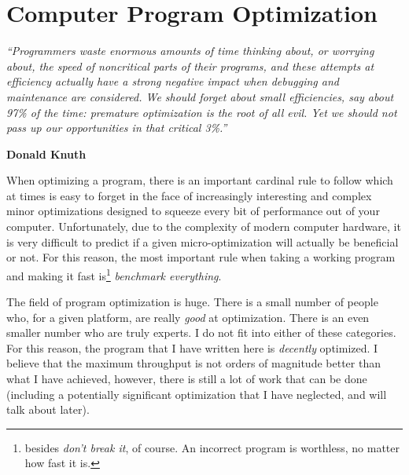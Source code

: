 \section{Computer Program Optimization} \label{app:opt}

\begin{addmargin}[16em]{0em}
	\begin{singlespace}
	{\footnotesize
	\textit{``Programmers waste enormous amounts of time thinking about, or worrying about, the speed of noncritical parts of their programs, and these attempts at efficiency actually have a strong negative impact when debugging and maintenance are considered. We should forget about small efficiencies, say about 97\% of the time: premature optimization is the root of all evil. Yet we should not pass up our opportunities in that critical 3\%.''}
		\begin{flushright}
		\textbf{Donald Knuth}
		\end{flushright}
	}
	\end{singlespace}
\end{addmargin}

When optimizing a program, there is an important cardinal rule to follow which at times
is easy to forget in the face of increasingly interesting and complex minor optimizations
designed to squeeze every bit of performance out of your computer. Unfortunately, due
to the complexity of modern computer hardware, it is
very difficult to predict if a given micro-optimization will actually be beneficial or
not. For this reason, the most important rule when taking a working program and making it
fast is\footnote{besides \textit{don't break it}, of course. An incorrect program is worthless, no matter
how fast it is.} \textit{benchmark everything}.

The field of program optimization is huge. There is a small number of people who, for
a given platform, are really \textit{good} at optimization. There is an even smaller number
who are truly experts. I do not fit into either of these categories. For this reason, the program
that I have written here is \textit{decently} optimized. I believe that the maximum throughput
is not orders of magnitude better than what I have achieved, however, there is still a lot of work
that can be done (including a potentially significant optimization that I have neglected, and will talk
about later).


